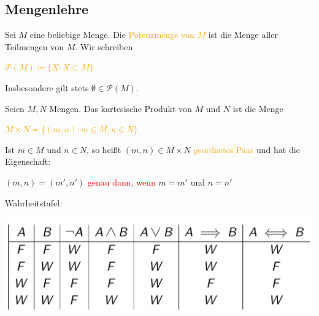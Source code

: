 \subsection[]{Mengenlehre}
\begin{definition}
Sei $M$ eine beliebige Menge. Die \textcolor{orange}{Potenzmenge von $M$} ist die Menge aller Teilmengen von $M$. Wir schreiben
\begin{center}
    \textcolor{orange}{$\mathcal{P}(M) \coloneqq \{X : X \subset M\}$}
\end{center}
Insbesondere gilt stets $\emptyset \in \mathcal{P}(M)$.
\end{definition}
\begin{definition}
Seien $M,N$ Mengen. Das kartesische Produkt von $M$ und $N$ ist die Menge
\begin{center}
    \textcolor{orange}{$M \times N = \{(m,n) : m \in M, n \in N\}$}
\end{center}
\end{definition}
\begin{definition}
Ist $m \in M$ und $n \in N$, so heißt $(m,n) \in M \times N$ \textcolor{orange}{geordnetes Paar} und hat die Eigenschaft: 
\begin{center}
   $(m,n) = (m',n')$ \textcolor{red}{genau dann, wenn} $m = m'$ und $n = n'$ 
\end{center}
\end{definition}
\newpage
\begin{remark}
Wahrheitstafel: 
\begin{center}
    \includegraphics[width = 8 cm]{Wahrheitstafel.png}
\end{center}
\end{remark}
